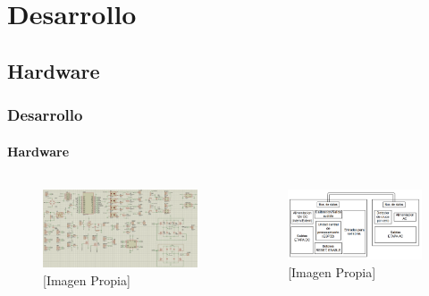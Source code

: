 \section{Desarrollo}

\subsection{Hardware}
\begin{frame}
\frametitle{Desarrollo}
\framesubtitle{Hardware}

\begin{columns}
	
\begin{figure}
	\centering
	\caption{[Imagen Propia]}
	\label{fig:esq}
	\includegraphics[width=\linewidth]{Imagenes/Proteus}
\end{figure}

\begin{figure}
	\caption{[Imagen Propia]}
	\label{fig:prot}
	\includegraphics[width=\linewidth]{Imagenes/Tarjeta}
\end{figure}

\end{columns}
\end{frame}

